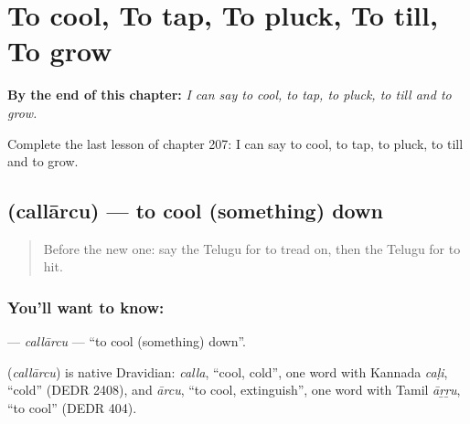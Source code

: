 
\chapter{To cool, To tap, To pluck, To till, To grow}
\label{ch:te-to-cool-to-tap-to-pluck-to-till-to-grow}

\begin{chapteropening}
\textbf{By the end of this chapter:} \emph{I can say to cool, to tap, to pluck, to till and to grow.}

Complete the last lesson of chapter 207: I can say to cool, to tap, to pluck, to till and to grow.
\end{chapteropening}

\section[\texorpdfstring{\te{చల్లార్చు} (callārcu)}{చల్లార్చు (callārcu)}]{ (callārcu) — to cool (something) down}

\label{lesson:TE-C207-callarcu}



\begin{quote}
Before the new one: say the Telugu for to tread on, then the Telugu for to hit.
\end{quote}

\subsection*{You'll want to know: }
\textbf{} — \emph{callārcu} — \textquotedblleft{}to cool (something) down\textquotedblright{}.

\begin{cousinweb}
\textbf{} (\emph{callārcu}) is native Dravidian: \emph{calla}, \textquotedblleft{}cool, cold\textquotedblright{}, one word with Kannada \emph{caḷi}, \textquotedblleft{}cold\textquotedblright{} (DEDR 2408), and \emph{ārcu}, \textquotedblleft{}to cool, extinguish\textquotedblright{}, one word with Tamil \emph{āṟṟu}, \textquotedblleft{}to cool\textquotedblright{} (DEDR 404).
\end{cousinweb}

